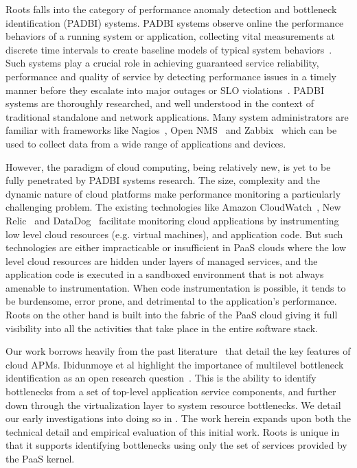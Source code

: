Roots falls into the category of performance anomaly detection and bottleneck identification (PADBI) systems.
PADBI systems observe online the performance behaviors
of a running system or application, collecting vital measurements at discrete time intervals to create baseline
models of typical system behaviors~\cite{Ibidunmoye:2015:PAD:2808687.2791120}. 
Such systems play a crucial role in achieving guaranteed service reliability, performance and
quality of service by detecting performance issues in a timely manner before they escalate into major outages
or SLO violations~\cite{6045942}. 
PADBI systems are thoroughly researched, and well understood in the context of traditional standalone and
network applications. Many system administrators are familiar with frameworks like 
Nagios~\cite{Harlan:2003:NMN:860375.860378}, Open NMS~\cite{opennms} and Zabbix~\cite{Tader:2010:SMZ:1883478.1883485} which
can be used to collect data from a wide range of applications and devices. 

However, the paradigm of cloud computing, being relatively new, is yet to be
fully penetrated by PADBI systems research. The size, complexity and the dynamic nature of 
cloud platforms make performance monitoring a particularly challenging problem.
The existing technologies like Amazon CloudWatch~\cite{cloudwatch},
New Relic~\cite{newrelic} and DataDog~\cite{datadog} facilitate monitoring cloud applications 
by instrumenting low level cloud resources (e.g. virtual machines), and application code. But such technologies
are either impracticable or insufficient in
PaaS clouds where the low level cloud resources are hidden under layers of managed
services, and the application code is executed in a sandboxed environment that is not
always amenable to instrumentation. When code instrumentation is possible, it tends to be
burdensome, error prone, and detrimental to the application's performance. Roots on the other hand is built into the 
fabric of the PaaS cloud giving it full visibility into all the activities that take place in the entire
software stack.

Our work borrows heavily from the past literature~\cite{DaCunhaRodrigues:2016:MCC:2851613.2851619,Ibidunmoye:2015:PAD:2808687.2791120} 
that detail the key features of cloud APMs. 
Ibidunmoye et al highlight the importance of multilevel bottleneck identification as an open research
question~\cite{Ibidunmoye:2015:PAD:2808687.2791120}. This is the ability to
identify bottlenecks from a set of top-level application service components, and further down through the 
virtualization layer to system resource bottlenecks.
We detail our early investigations into doing so
in \cite{Jayathilaka:2017:PMR:3038912.3052649}. The work herein expands 
upon both the technical detail and empirical evaluation of this initial 
work.  Roots is unique in that it supports identifying bottlenecks using only the set of services provided by the PaaS kernel.  

